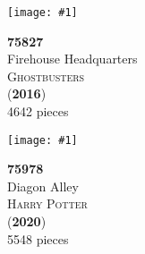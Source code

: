 \documentclass[letterpaper]{article}%
\newenvironment{legocell}[1]
{
	\begin{minipage}[c][2.0in][c]{4in}
	\centering
	\varwidth{3.6in}
	\raggedright %
	\begin{minipage}[c]{1.3in}
		\texttt{[image: \#1]}
	\end{minipage}
	\begin{minipage}[c]{2.2in}
	\raggedright
}
{
	\end{minipage}
	\endvarwidth
	\end{minipage}
	\allowbreak
	\ignorespaces
}
\begin{document}
\begin{legocell}{images/set_75827-1.jpg}
\textbf{75827}\\
{\sffamily\large Firehouse Headquarters}\\
\textsc{\color{DarkBlue}\normalsize Ghostbusters}\\
(\textbf{2016})\\
{\normalsize 4642 pieces}\\
\end{legocell}
\begin{legocell}{images/set_75978-1.jpg}
\textbf{75978}\\
{\sffamily\large Diagon Alley}\\
\textsc{\color{DarkBlue}\normalsize Harry Potter}\\
(\textbf{2020})\\
{\normalsize 5548 pieces}\\
\end{legocell}
\end{document}
